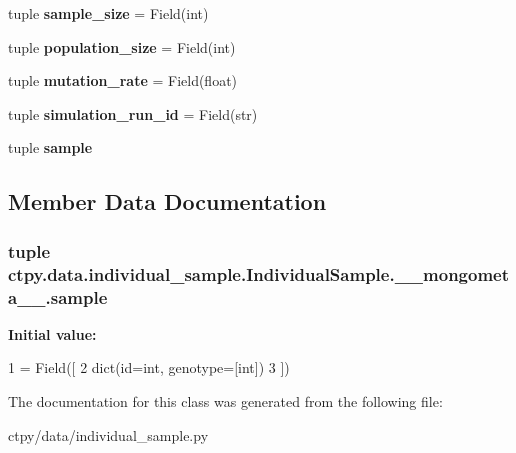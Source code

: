 \begin{DoxyCompactItemize}
\item 
\hypertarget{classctpy_1_1data_1_1individual__sample_1_1_individual_sample_1_1____mongometa_____ad1d24241937a8f99537cfa1ba0215276}{tuple {\bfseries sample\-\_\-size} = Field(int)}\label{classctpy_1_1data_1_1individual__sample_1_1_individual_sample_1_1____mongometa_____ad1d24241937a8f99537cfa1ba0215276}

\item 
\hypertarget{classctpy_1_1data_1_1individual__sample_1_1_individual_sample_1_1____mongometa_____a1e3dc1cb8904f2607c5343eb16ebb83e}{tuple {\bfseries population\-\_\-size} = Field(int)}\label{classctpy_1_1data_1_1individual__sample_1_1_individual_sample_1_1____mongometa_____a1e3dc1cb8904f2607c5343eb16ebb83e}

\item 
\hypertarget{classctpy_1_1data_1_1individual__sample_1_1_individual_sample_1_1____mongometa_____a307cb270cdd1690ca526dbcce4887cf0}{tuple {\bfseries mutation\-\_\-rate} = Field(float)}\label{classctpy_1_1data_1_1individual__sample_1_1_individual_sample_1_1____mongometa_____a307cb270cdd1690ca526dbcce4887cf0}

\item 
\hypertarget{classctpy_1_1data_1_1individual__sample_1_1_individual_sample_1_1____mongometa_____a54170a4f293522bc30c841f1c0deab58}{tuple {\bfseries simulation\-\_\-run\-\_\-id} = Field(str)}\label{classctpy_1_1data_1_1individual__sample_1_1_individual_sample_1_1____mongometa_____a54170a4f293522bc30c841f1c0deab58}

\item 
tuple {\bfseries sample}
\end{DoxyCompactItemize}


\subsection{Member Data Documentation}
\hypertarget{classctpy_1_1data_1_1individual__sample_1_1_individual_sample_1_1____mongometa_____a1faebff286936180b25392ff4f65a0b1}{
\subsubsection[{sample}]{\setlength{\rightskip}{0pt plus 5cm}tuple ctpy.\-data.\-individual\-\_\-sample.\-Individual\-Sample.\-\_\-\-\_\-mongometa\-\_\-\-\_\-.\-sample\hspace{0.3cm}{\ttfamily [static]}}}\label{classctpy_1_1data_1_1individual__sample_1_1_individual_sample_1_1____mongometa_____a1faebff286936180b25392ff4f65a0b1}
{\bfseries Initial value\-:}
\begin{DoxyCode}
1 = Field([
2             dict(id=int, genotype=[int])
3         ])
\end{DoxyCode}


The documentation for this class was generated from the following file\-:\begin{DoxyCompactItemize}
\item 
ctpy/data/individual\-\_\-sample.\-py\end{DoxyCompactItemize}
